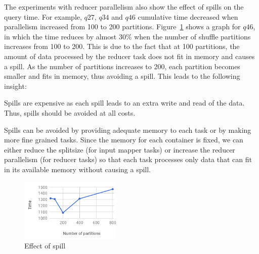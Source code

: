 The experiments with reducer parallelism also show the effect of spills on the query time. For example, $q27$, $q34$ and $q46$ cumulative time decreased when parallelism increased from 100 to 200 partitions. Figure~\ref{fig:q46} shows a graph for $q46$, in which the time reduces by almost 30\% when the number of shuffle partitions increases from 100 to 200. This is due to the fact that at 100 partitions, the amount of data processed by the reducer task does not fit in memory and causes a spill. As the number of partitions increases to 200, each partition becomes smaller and fits in memory, thus avoiding a spill. This leads to the following insight:
\begin{insight}
	\label{insight:spill}
	Spills are expensive as each spill leads to an extra write and read of the data. Thus, spills should be avoided at all costs.
\end{insight}
Spills can be avoided by providing adequate memory to each task or by making more fine grained tasks. Since the memory for each container is fixed, we can either reduce the splitsize (for input mapper tasks) or increase the reducer parallelism (for reducer tasks) so that each task processes only data that can fit in its available memory without causing a spill.

\begin{figure}[h]
	\centering\includegraphics[height=3cm]{fig/q46.png}
	\caption{Effect of spill}
	\label{fig:q46}
\end{figure}


